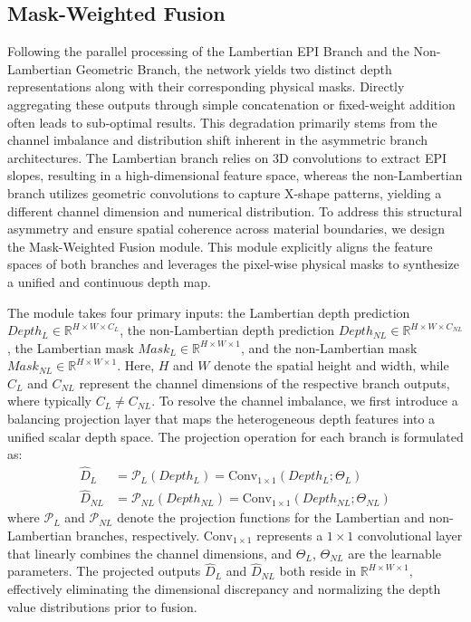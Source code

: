 \documentclass[lettersize,journal]{IEEEtran}
\begin{document}
\subsection{Mask-Weighted Fusion}

Following the parallel processing of the Lambertian EPI Branch and the Non-Lambertian Geometric Branch, the network yields two distinct depth representations along with their corresponding physical masks. Directly aggregating these outputs through simple concatenation or fixed-weight addition often leads to sub-optimal results. This degradation primarily stems from the channel imbalance and distribution shift inherent in the asymmetric branch architectures. The Lambertian branch relies on 3D convolutions to extract EPI slopes, resulting in a high-dimensional feature space, whereas the non-Lambertian branch utilizes geometric convolutions to capture X-shape patterns, yielding a different channel dimension and numerical distribution. To address this structural asymmetry and ensure spatial coherence across material boundaries, we design the Mask-Weighted Fusion module. This module explicitly aligns the feature spaces of both branches and leverages the pixel-wise physical masks to synthesize a unified and continuous depth map.

The module takes four primary inputs: the Lambertian depth prediction $Depth_L \in \mathbb{R}^{H \times W \times C_L}$, the non-Lambertian depth prediction $Depth_{NL} \in \mathbb{R}^{H \times W \times C_{NL}}$, the Lambertian mask $Mask_L \in \mathbb{R}^{H \times W \times 1}$, and the non-Lambertian mask $Mask_{NL} \in \mathbb{R}^{H \times W \times 1}$. Here, $H$ and $W$ denote the spatial height and width, while $C_L$ and $C_{NL}$ represent the channel dimensions of the respective branch outputs, where typically $C_L \neq C_{NL}$. To resolve the channel imbalance, we first introduce a balancing projection layer that maps the heterogeneous depth features into a unified scalar depth space. The projection operation for each branch is formulated as:
\begin{align}
\hat{D}_L &= \mathcal{P}_L(Depth_L) = \text{Conv}_{1 \times 1}(Depth_L; \Theta_L) \\
\hat{D}_{NL} &= \mathcal{P}_{NL}(Depth_{NL}) = \text{Conv}_{1 \times 1}(Depth_{NL}; \Theta_{NL})
\end{align}
where $\mathcal{P}_L$ and $\mathcal{P}_{NL}$ denote the projection functions for the Lambertian and non-Lambertian branches, respectively. $\text{Conv}_{1 \times 1}$ represents a $1 \times 1$ convolutional layer that linearly combines the channel dimensions, and $\Theta_L$, $\Theta_{NL}$ are the learnable parameters. The projected outputs $\hat{D}_L$ and $\hat{D}_{NL}$ both reside in $\mathbb{R}^{H \times W \times 1}$, effectively eliminating the dimensional discrepancy and normalizing the depth value distributions prior to fusion.
\end{document}
